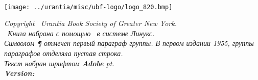 \begin{center}
\bibcovertitlefont\urantiabook\\
\upshape
{}
\texttt{[image: ../urantia/misc/ubf-logo/logo\_820.bmp]} \\
\end{center}

\titleframe

\newpage

\begin{center}
\itshape
{}
Copyright \textcopyright\ Urantia Book Society of Greater New York.\\
\tux\ Книга набрана с помощью \XeLaTeX\ в системе Линукс.\\
Символом {\upshape \P} отмечен первый параграф группы. В первом издании 1955, группы параграфов отделяла пустая строка.\\
Текст набран шрифтом \textbf{Adobe \urantiamainfont} \urantiamainfontsize pt.\\[4pt]
\upshape\normalsize\bfseries Version: \mytoday{}\\
\end{center}

\titleframe
